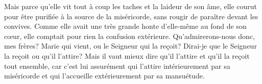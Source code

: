 Mais parce qu’elle vit tout à coup les taches et la laideur de son âme,
	elle courut pour être purifiée à la source de la miséricorde,
	sans rougir de paraître devant les convives.
Comme elle avait une très grande honte d’elle-même au fond de son cœur,
	elle comptait pour rien la confusion extérieure.
Qu’admirerons-nous donc, mes frères?
	Marie qui vient, ou le Seigneur qui la reçoit?
Dirai-je que le Seigneur la reçoit ou qu’il l’attire?
	Mais il vaut mieux dire qu’il l’attire et qu’il la reçoit tout ensemble,
	car c’est lui assurément qui l’attire intérieurement par sa miséricorde
	et qui l’accueille extérieurement par sa mansuétude.
